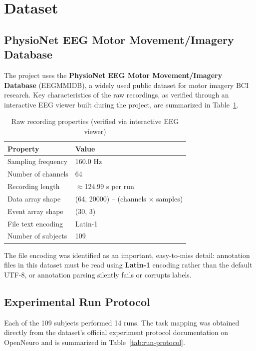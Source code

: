 \documentclass[11pt,a4paper]{article}
\begin{document}
\section{Dataset}

\subsection{PhysioNet EEG Motor Movement/Imagery Database}
The project uses the \textbf{PhysioNet EEG Motor Movement/Imagery Database} (EEGMMIDB), a widely used public dataset for motor imagery BCI research. Key characteristics of the raw recordings, as verified through an interactive EEG viewer built during the project, are summarized in Table~\ref{tab:dataset-props}.

\begin{table}[h!]
\centering
\caption{Raw recording properties (verified via interactive EEG viewer)}
\label{tab:dataset-props}
\begin{tabular}{ll}
\toprule
\textbf{Property} & \textbf{Value} \\
\midrule
Sampling frequency & 160.0 Hz \\
Number of channels & 64 \\
Recording length & $\approx$124.99 s per run \\
Data array shape & (64, 20000) -- (channels $\times$ samples) \\
Event array shape & (30, 3) \\
File text encoding & Latin-1 \\
Number of subjects & 109 \\
\bottomrule
\end{tabular}
\end{table}

The file encoding was identified as an important, easy-to-miss detail: annotation files in this dataset must be read using \textbf{Latin-1} encoding rather than the default UTF-8, or annotation parsing silently fails or corrupts labels.

\subsection{Experimental Run Protocol}
Each of the 109 subjects performed 14 runs. The task mapping was obtained directly from the dataset's official experiment protocol documentation on OpenNeuro and is summarized in Table~\ref{tab:run-protocol}.
\end{document}
